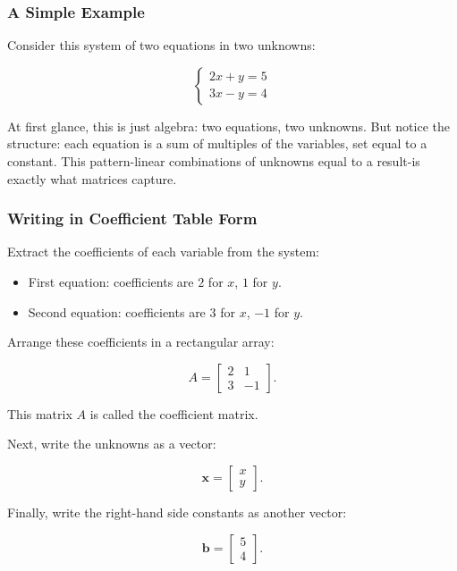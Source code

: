 \documentclass[
  letterpaper,
  DIV=11,
  numbers=noendperiod]{scrreprt}
\providecommand{\tightlist}{%
  \setlength{\itemsep}{0pt}\setlength{\parskip}{0pt}}
\begin{document}
\subsubsection{A Simple Example}\label{a-simple-example}

Consider this system of two equations in two unknowns:

\[
\begin{cases}  
2x + y = 5 \\  
3x - y = 4  
\end{cases}
\]

At first glance, this is just algebra: two equations, two unknowns. But
notice the structure: each equation is a sum of multiples of the
variables, set equal to a constant. This pattern-linear combinations of
unknowns equal to a result-is exactly what matrices capture.

\subsubsection{Writing in Coefficient Table
Form}\label{writing-in-coefficient-table-form}

Extract the coefficients of each variable from the system:

\begin{itemize}
\tightlist
\item
  First equation: coefficients are \(2\) for \(x\), \(1\) for \(y\).
\item
  Second equation: coefficients are \(3\) for \(x\), \(-1\) for \(y\).
\end{itemize}

Arrange these coefficients in a rectangular array:

\[
A = \begin{bmatrix}  
2 & 1 \\  
3 & -1  
\end{bmatrix}.
\]

This matrix \(A\) is called the coefficient matrix.

Next, write the unknowns as a vector:

\[
\mathbf{x} = \begin{bmatrix} x \\ y \end{bmatrix}.
\]

Finally, write the right-hand side constants as another vector:

\[
\mathbf{b} = \begin{bmatrix} 5 \\ 4 \end{bmatrix}.
\]
\end{document}
